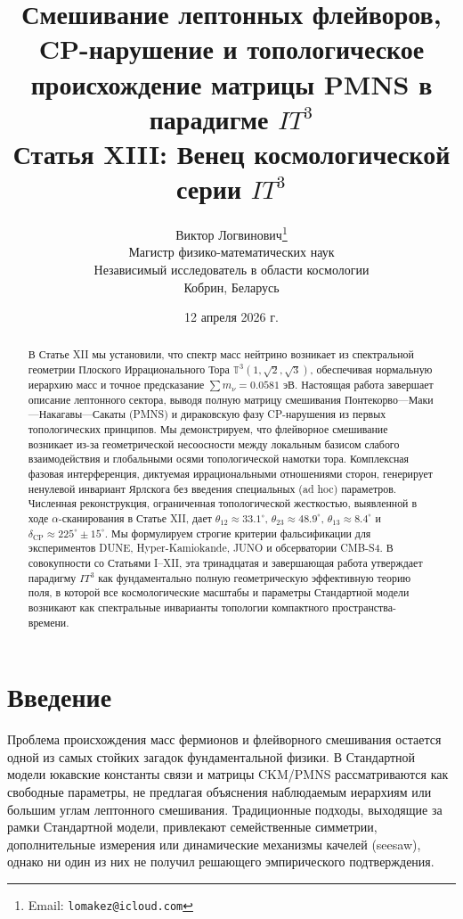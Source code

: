 \documentclass[12pt,a4paper]{article}
\title{\textbf{Смешивание лептонных флейворов, CP-нарушение и топологическое происхождение матрицы PMNS в парадигме $IT^3$}\\
\large Статья XIII: Венец космологической серии $IT^3$}
\author{Виктор Логвинович\thanks{Email: \texttt{lomakez@icloud.com}}\\
Магистр физико-математических наук\\
Независимый исследователь в области космологии\\
Кобрин, Беларусь}
\date{12 апреля 2026 г.}
\begin{document}
\maketitle

\begin{abstract}
В Статье XII мы установили, что спектр масс нейтрино возникает из спектральной геометрии Плоского Иррационального Тора $\mathbb{T}^3(1,\sqrt{2},\sqrt{3})$, обеспечивая нормальную иерархию масс и точное предсказание $\sum m_\nu = 0.0581$ эВ. Настоящая работа завершает описание лептонного сектора, выводя полную матрицу смешивания Понтекорво—Маки—Накагавы—Сакаты (PMNS) и дираковскую фазу CP-нарушения из первых топологических принципов. Мы демонстрируем, что флейворное смешивание возникает из-за геометрической несоосности между локальным базисом слабого взаимодействия и глобальными осями топологической намотки тора. Комплексная фазовая интерференция, диктуемая иррациональными отношениями сторон, генерирует ненулевой инвариант Ярлскога без введения специальных (ad hoc) параметров. Численная реконструкция, ограниченная топологической жесткостью, выявленной в ходе $\alpha$-сканирования в Статье XII, дает $\theta_{12} \approx 33.1^\circ$, $\theta_{23} \approx 48.9^\circ$, $\theta_{13} \approx 8.4^\circ$ и $\delta_{\text{CP}} \approx 225^\circ \pm 15^\circ$. Мы формулируем строгие критерии фальсификации для экспериментов DUNE, Hyper-Kamiokande, JUNO и обсерватории CMB-S4. В совокупности со Статьями I--XII, эта тринадцатая и завершающая работа утверждает парадигму $IT^3$ как фундаментально полную геометрическую эффективную теорию поля, в которой все космологические масштабы и параметры Стандартной модели возникают как спектральные инварианты топологии компактного пространства-времени.
\end{abstract}

\section{Введение}
Проблема происхождения масс фермионов и флейворного смешивания остается одной из самых стойких загадок фундаментальной физики. В Стандартной модели юкавские константы связи и матрицы CKM/PMNS рассматриваются как свободные параметры, не предлагая объяснения наблюдаемым иерархиям или большим углам лептонного смешивания. Традиционные подходы, выходящие за рамки Стандартной модели, привлекают семейственные симметрии, дополнительные измерения или динамические механизмы качелей (seesaw), однако ни один из них не получил решающего эмпирического подтверждения.
\end{document}
